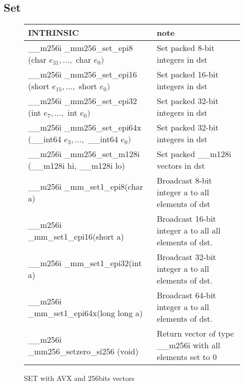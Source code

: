 \documentclass{article}
\begin{document}
\subsection{Set}
\vspace{1cm}
\begin{figure}[h!]
\noindent
\noindent\begin{tabular}{|l|l|}
  \hline
  INTRINSIC & note \\
  \hline
\_\_m256i \_mm256\_set\_epi8 (char $e_{31},\ldots,$ char $e_{0})$ & Set packed 8-bit integers in dst \\
\_\_m256i \_mm256\_set\_epi16 (short $e_{15},\ldots,$ short $e_{0})$ & Set packed 16-bit integers in dst \\
  \hline
\_\_m256i \_mm256\_set\_epi32 (int $e_{7},\ldots,$ int $e_{0})$ & Set packed 32-bit integers in dst \\  
\hline
\_\_m256i \_mm256\_set\_epi64x (\_\_int64 $e_{3},\ldots,$ \_\_int64 $e_{0})$ & Set packed 32-bit integers in dst \\
\hline
\_\_m256i \_mm256\_set\_m128i (\_\_m128i hi, \_\_m128i lo) & Set packed \_\_m128i vectors in dst \\
\hline
  \_\_m256i \_mm\_set1\_epi8(char a) & Broadcast 8-bit integer a to all elements of dst\\
  \hline
   \_\_m256i \_mm\_set1\_epi16(short a) & Broadcast 16-bit integer a to all all elements of dst.\\
  \hline 
   \_\_m256i \_mm\_set1\_epi32(int a) & Broadcast 32-bit integer a to all elements of dst.\\
  \hline
  \_\_m256i \_mm\_set1\_epi64x(long long a) & Broadcast 64-bit integer a to all elements of dst.\\
  \hline
  \_\_m256i \_mm256\_setzero\_si256 (void) & Return vector of type \_\_m256i with all elements set to 0 \\
  \hline
\end{tabular}
\caption{SET with AVX and 256bits vectors}
\label{fig:set of set 256 avx2 instructions}
\end{figure}
\end{document}
